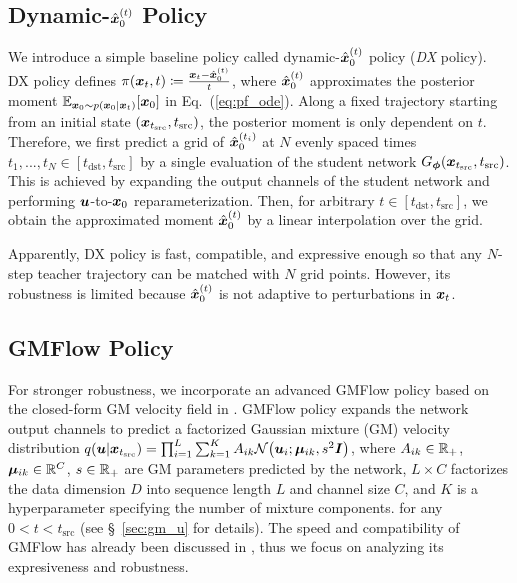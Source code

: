 \subsection{Dynamic-\texorpdfstring{$\hat{{\bm{x}}}_0^{(t)}$}{x0} Policy}
We introduce a simple baseline policy called dynamic-$\hat{{\bm{x}}}_0^{(t)}$ policy (\emph{DX} policy). DX policy defines $\pi({\bm{x}}_t, t)\coloneqq \frac{{\bm{x}}_t - \hat{{\bm{x}}}_0^{(t)}}{t}$, 
where $\hat{{\bm{x}}}_0^{(t)}$ approximates the posterior moment $\mathbb{E}_{{\bm{x}}_0 \sim p({\bm{x}}_0 | {\bm{x}}_t)} [{\bm{x}}_0]$ in Eq.~(\ref{eq:pf_ode}). 
Along a fixed trajectory starting from an initial state $({\bm{x}}_{t_\text{src}}, t_\text{src})$, the posterior moment is only dependent on $t$. 
Therefore, we first predict a grid of $\hat{{\bm{x}}}_0^{(t_i)}$ at $N$ evenly spaced times 
$t_1, ..., t_N \in [t_\text{dst}, t_\text{src}]$ by a single evaluation of the student network $G_{\bm{\phi}}({\bm{x}}_{t_\text{src}}, t_\text{src})$. 
This is achieved by expanding the output channels of the student network and performing ${\bm{u}}$-to-${\bm{x}}_0$ reparameterization.
Then, for arbitrary $t \in [t_\text{dst}, t_\text{src}]$, we obtain the approximated moment $\hat{{\bm{x}}}_0^{(t)}$ by a linear interpolation over the grid. 

Apparently, DX policy is fast, compatible, and expressive enough so that any $N$-step teacher trajectory can be matched with $N$ grid points. 
However, its robustness is limited because $\hat{{\bm{x}}}_0^{(t)}$ is not adaptive to perturbations in ${\bm{x}}_t$. 

\subsection{GMFlow Policy}
\label{sec:gmpolicy}

For stronger robustness, we incorporate an advanced GMFlow policy based on the closed-form GM velocity field in \citet{gmflow}.
GMFlow policy expands the network output channels to predict a factorized Gaussian mixture (GM) velocity distribution $q(\vu | \vx_{t_\text{src}}) = \prod_{i=1}^{L} \sum_{k=1}^K A_{ik} \mathcal{N}\left(\vu_i; \vmu_{ik}, s^2\mI\right)$, where $A_{ik} \in \mathbb{R}_+$, ${\bm{\mu}}_{ik} \in \mathbb{R}^C$, $s \in \mathbb{R}_+ $ are GM parameters predicted by the network,
$L\times C$ factorizes the data dimension $D$ into sequence length $L$ and channel size $C$, and $K$ is a hyperparameter specifying the number of mixture components. 
 for any $0 < t < t_\text{src}$ (see \S~\ref{sec:gm_u} for details). The speed and compatibility of GMFlow has already been discussed in \citet{gmflow}, thus we focus on analyzing its expresiveness and robustness.

